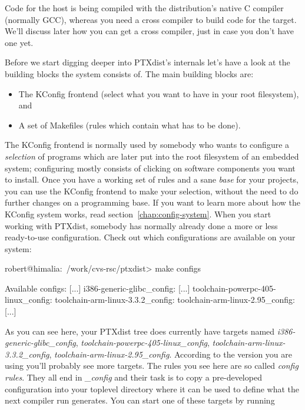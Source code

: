 Code for the host is being compiled with the distribution's native C
compiler (normally GCC), whereas you need a cross compiler to build code
for the target. We'll discuss later how you can get a cross compiler,
just in case you don't have one yet. 

Before we start digging deeper into PTXdist's internals let's have a
look at the building blocks the system consists of. The main building
blocks are: 

\begin{itemize}
\item The KConfig frontend (select what you want to have in your root
      filesystem), and
\item A set of Makefiles (rules which contain what has to be done).
\end{itemize}

The KConfig frontend is normally used by somebody who wants to configure
a \emph{selection} of programs which are later put into the root
filesystem of an embedded system; configuring mostly consists of
clicking on software components you want to install. Once you have a
working set of rules and a sane \emph{base} for your projects, you can
use the KConfig frontend to make your selection, without the need to do
further changes on a programming base. If you want to learn more about
how the KConfig system works, read section~\ref{chap:config-system}.
When you start working with PTXdist, somebody has normally already done
a more or less ready-to-use configuration. Check out which
configurations are available on your system: 

\begin{code}
robert@himalia:~/work/cvs-rsc/ptxdist> make configs

Available configs: 
[...]
i386-generic-glibc_config: 
[...]
toolchain-powerpc-405-linux_config:
toolchain-arm-linux-3.3.2_config:
toolchain-arm-linux-2.95_config:
[...]
\end{code} 

As you can see here, your PTXdist tree does currently have targets named
\emph{i386-generic-glibc\_config},
\emph{toolchain-powerpc-405-linux\_config},
\emph{toolchain-arm-linux-3.3.2\_config},
\emph{toolchain-arm-linux-2.95\_config}. According to the version you
are using you'll probably see more targets. The rules you see here are
so called \emph{config rules}. They all end in \emph{\_config} and their
task is to copy a pre-developed configuration into your toplevel
directory where it can be used to define what the next compiler run
generates. You can start one of these targets by running

